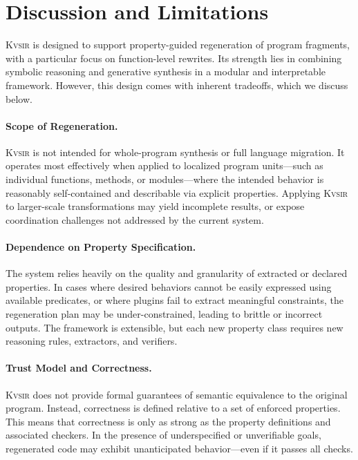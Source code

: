 \documentclass[sigplan]{acmart}
\newcommand{\sys}{{\scshape Kv{\textalpha}sir}\xspace}
\begin{document}
\section{Discussion and Limitations}

\sys is designed to support property-guided regeneration of program fragments, with a particular focus on function-level rewrites. Its strength lies in combining symbolic reasoning and generative synthesis in a modular and interpretable framework. However, this design comes with inherent tradeoffs, which we discuss below.

\paragraph{Scope of Regeneration.}
\sys is not intended for whole-program synthesis or full language migration. It operates most effectively when applied to localized program units—such as individual functions, methods, or modules—where the intended behavior is reasonably self-contained and describable via explicit properties. Applying \sys to larger-scale transformations may yield incomplete results, or expose coordination challenges not addressed by the current system.

\paragraph{Dependence on Property Specification.}
The system relies heavily on the quality and granularity of extracted or declared properties. In cases where desired behaviors cannot be easily expressed using available predicates, or where plugins fail to extract meaningful constraints, the regeneration plan may be under-constrained, leading to brittle or incorrect outputs. The framework is extensible, but each new property class requires new reasoning rules, extractors, and verifiers.

\paragraph{Trust Model and Correctness.}
\sys does not provide formal guarantees of semantic equivalence to the original program. Instead, correctness is defined relative to a set of enforced properties. This means that correctness is only as strong as the property definitions and associated checkers. In the presence of underspecified or unverifiable goals, regenerated code may exhibit unanticipated behavior—even if it passes all checks.
\end{document}

